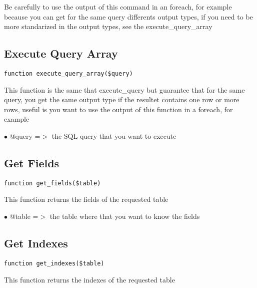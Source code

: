 \documentclass[a4paper]{book}
\begin{document}
Be carefully to use the output of this command in an foreach, for example
because you can get for the same query differents output types, if you
need to be more standarized in the output types, see the execute\_query\_array

\hypertarget{toc230}{}
\subsection{Execute Query Array}

\begin{lstlisting}
function execute_query_array($query)
\end{lstlisting}

This function is the same that execute\_query but guarantee that for the
same query, you get the same output type if the resultet contains one
row or more rows, useful is you want to use the output of this function
in a foreach, for example

\begin{compactitem}
\item[\color{myblue}$\bullet$] @query =$>$ the SQL query that you want to execute
\end{compactitem}

\hypertarget{toc231}{}
\subsection{Get Fields}

\begin{lstlisting}
function get_fields($table)
\end{lstlisting}

This function returns the fields of the requested table

\begin{compactitem}
\item[\color{myblue}$\bullet$] @table =$>$ the table where that you want to know the fields
\end{compactitem}

\hypertarget{toc232}{}
\subsection{Get Indexes}

\begin{lstlisting}
function get_indexes($table)
\end{lstlisting}

This function returns the indexes of the requested table
\end{document}
